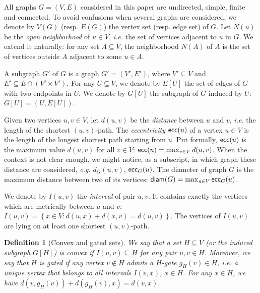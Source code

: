 \documentclass[11pt,letterpaper]{article}
\newtheorem{definition}{Definition}
\newcommand{\set}[1]{\left\{ #1 \right\}}
\newcommand{\diam}{\mbox{\textsf{diam}}}
\newcommand{\ecc}{\mbox{\textsf{ecc}}}
\begin{document}
All graphs $G = (V,E)$ considered in this paper are undirected, simple, finite and connected. To avoid confusions when several graphs are considered, we denote by $V(G)$ (resp. $E(G)$) the vertex set (resp. edge set) of $G$. Let $N(u)$ be the \textit{open neighborhood} of $u \in V$, {\em i.e.} the set of vertices adjacent to $u$ in $G$. We extend it naturally: for any set $A \subseteq V$, the neighborhood $N(A)$ of $A$ is the set of vertices outside $A$ adjacent to some $u \in A$.

A subgraph $G'$ of $G$ is a graph $G'=(V',E')$, where $V' \subseteq V$ and $E' \subseteq E\cap (V' \times V')$. 
For any $U \subseteq V$, we denote by $E\left[U\right]$ the set of edges of $G$ with two endpoints in $U$. We denote by $G\left[U\right]$ the subgraph of $G$ induced by $U$: $G\left[U\right] = \left(U,E\left[U\right]\right)$. 

Given two vertices $u,v \in V$, let $d(u,v)$ be the \textit{distance} between $u$ and $v$, {\em i.e.} the length of the shortest $(u,v)$-path. The \textit{eccentricity} $\ecc(u)$ of a vertex $u \in V$ is the length of the longest shortest path starting from $u$. Put formally, $\ecc(u)$ is the maximum value $d(u,v)$ for all $v \in V$: $\ecc(u) = \max_{v \in V} d(u,v)$. When the context is not clear enough, we might notice, as a subscript, in which graph these distance are considered, {\em e.g.} $d_G(u,v)$, $\ecc_G(u)$. The diameter of graph $G$ is the maximum distance between two of its vertices: $\diam(G) = \max_{u \in V} \ecc_G(u)$. 

We denote by $I(u,v)$ the \textit{interval} of pair $u,v$. It contains exactly the vertices which are metrically between $u$ and $v$:
$I(u,v) = \set{x \in V: d(u,x) + d(x,v) = d(u,v)}$. The vertices of $I(u,v)$ are lying on at least one shortest $(u,v)$-path.

\begin{definition}[Convex and gated sets]
We say that a set $H\subseteq V$ (or the induced subgraph $G\left[H\right]$) is \emph{convex} if $I(u,v) \subseteq H$ for any pair $u,v \in H$. Moreover, we say that $H$ is \emph{gated} if any vertex $v \notin H$ admits a $H$-\emph{gate} $g_H(v) \in H$, {\em i.e.} a unique vertex that belongs to all intervals $I(v,x)$, $x\in H$. For any $x \in H$, we have $d(v,g_H(v)) + d(g_H(v),x) = d(v,x)$. 
\end{definition}
\end{document}
